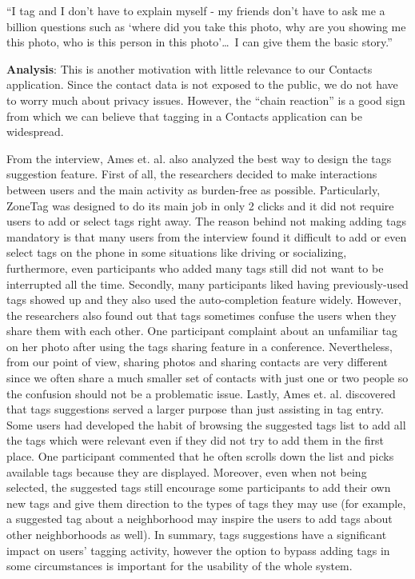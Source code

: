 \begin{itemize}
      ``I tag and I don't have to explain myself - my friends don't have to ask me a billion questions such as `where did you take this photo, why are you showing me this photo, who is this person in this photo'\ldots \ I can give them the basic story.''

      \textbf{Analysis}: This is another motivation with little relevance to our Contacts application. Since the contact data is not exposed to the public, we do not have to worry much about privacy issues. However, the ``chain reaction'' is a good sign from which we can believe that tagging in a Contacts application can be widespread.

\end{itemize}

From the interview, Ames et. al. also analyzed the best way to design the tags suggestion feature. First of all, the researchers decided to make interactions between users and the main activity as burden-free as possible. Particularly, ZoneTag was designed to do its main job in only 2 clicks and it did not require users to add or select tags right away. The reason behind not making adding tags mandatory is that many users from the interview found it difficult to add or even select tags on the phone in some situations like driving or socializing, furthermore, even participants who added many tags still did not want to be interrupted all the time. Secondly, many participants liked having previously-used tags showed up and they also used the auto-completion feature widely. However, the researchers also found out that tags sometimes confuse the users when they share them with each other. One participant complaint about an unfamiliar tag on her photo after using the tags sharing feature in a conference. Nevertheless, from our point of view, sharing photos and sharing contacts are very different since we often share a much smaller set of contacts with just one or two people so the confusion should not be a problematic issue. Lastly, Ames et. al. discovered that tags suggestions served a larger purpose than just assisting in tag entry. Some users had developed the habit of browsing the suggested tags list to add all the tags which were relevant even if they did not try to add them in the first place. One participant commented that he often scrolls down the list and picks available tags because they are displayed. Moreover, even when not being selected, the suggested tags still encourage some participants to add their own new tags and give them direction to the types of tags they may use (for example, a suggested tag about a neighborhood may inspire the users to add tags about other neighborhoods as well). In summary, tags suggestions have a significant impact on users' tagging activity, however the option to bypass adding tags in some circumstances is important for the usability of the whole system.

